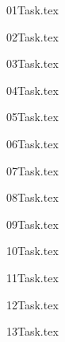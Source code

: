 \documentclass[a4paper,12pt,norsk]{article}
\begin{document}
\maketitle
\pagebreak
\tableofcontents

\pagebreak
{01Task.tex}

\pagebreak
{02Task.tex}

\pagebreak
{03Task.tex}

\pagebreak
{04Task.tex}

\pagebreak
{05Task.tex}

\pagebreak
{06Task.tex}

\pagebreak
{07Task.tex}

\pagebreak
{08Task.tex}

\pagebreak
{09Task.tex}

\pagebreak
{10Task.tex}

\pagebreak
{11Task.tex}

\pagebreak
{12Task.tex}

\pagebreak
{13Task.tex}
\end{document}
